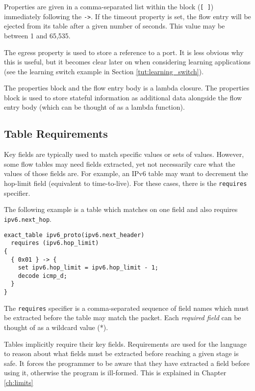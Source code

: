 Properties are given in a comma-separated list within the block (\texttt{[ ]}) 
immediately following the \texttt{->}. 
If the timeout property is set, the flow entry will be ejected from its table
after a given number of seconds. This value may be between 1 and 65,535.

The egress property is used to store a reference to a port.
It is less obvious why this is useful, but it becomes clear later on when
considering learning applications (see the learning switch example in Section
\ref{tut:learning_switch}).

The properties block and the flow entry body is a lambda closure. 
The properties block is used to
store stateful information as additional data alongside the flow entry
body (which can be thought of as a lambda function).

\subsection{Table Requirements} \label{tut:table_req}

Key fields are typically used to match specific values or sets of values. However, some flow tables may need fields extracted, yet not
necessarily care what the values of those fields are. 
For example, an IPv6 table
may want to decrement the hop-limit field (equivalent to time-to-live).
For these cases, there is the \texttt{requires} specifier.

The following example is a table which matches on one field and also requires
\texttt{ipv6.next\_hop}.

\begin{codepage}
\begin{lstlisting}
exact_table ipv6_proto(ipv6.next_header)
  requires (ipv6.hop_limit) 
{
  { 0x01 } -> {
  	set ipv6.hop_limit = ipv6.hop_limit - 1; 
  	decode icmp_d;
  }
}
\end{lstlisting}
\end{codepage}

The \texttt{requires} specifier is a comma-separated sequence of field names
which must be extracted before the table may match the packet.
Each \textit{required field} can be thought of as a wildcard value (*).

Tables implicitly require their key fields. 
Requirements are used for the language to reason about what
fields must be extracted before reaching a given stage is safe.
It forces the programmer to be aware that they have extracted
a field before using it, otherwise the program is ill-formed. This
is explained in Chapter \ref{ch:limits}

